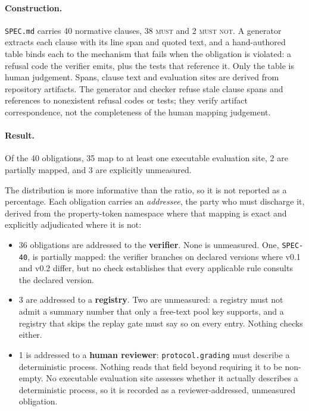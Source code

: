 \documentclass[11pt]{article}
\begin{document}
\paragraph{Construction.} \texttt{SPEC.md} carries 40 normative clauses, 38 \textsc{must} and 2
\textsc{must not}. A generator extracts each clause with its line span and quoted text, and a
hand-authored table binds each to the mechanism that fails when the obligation is violated: a
refusal code the verifier emits, plus the tests that reference it. Only the table is human
judgement. Spans, clause text and evaluation sites are derived from repository artifacts. The
generator and checker refuse stale clause spans and references to nonexistent refusal codes or
tests; they verify artifact correspondence, not the completeness of the human mapping
judgement.

\paragraph{Result.} Of the 40 obligations, 35 map to at least one executable evaluation site, 2
are partially mapped, and 3 are explicitly unmeasured.

The distribution is more informative than the ratio, so it is not reported as a percentage. Each
obligation carries an \emph{addressee}, the party who must discharge it, derived from the
property-token namespace where that mapping is exact and explicitly adjudicated where it is not:

\begin{itemize}
\item 36 obligations are addressed to the \textbf{verifier}. None is unmeasured. One,
\texttt{SPEC-40}, is partially mapped: the verifier branches on declared versions where v0.1 and
v0.2 differ, but no check establishes that every applicable rule consults the declared version.
\item 3 are addressed to a \textbf{registry}. Two are unmeasured: a registry must not admit a
summary number that only a free-text pool key supports, and a registry that skips the replay
gate must say so on every entry. Nothing checks either.
\item 1 is addressed to a \textbf{human reviewer}: \texttt{protocol.grading} must describe a
deterministic process. Nothing reads that field beyond requiring it to be non-empty. No
executable evaluation site assesses whether it actually describes a deterministic process, so it
is recorded as a reviewer-addressed, unmeasured obligation.
\end{itemize}
\end{document}
